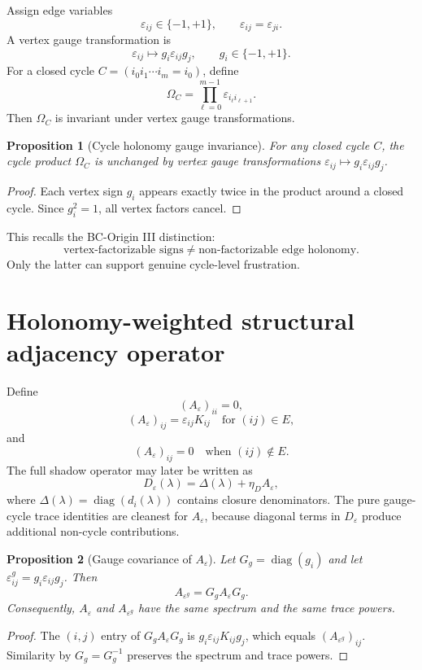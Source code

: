 \documentclass[11pt]{article}
\newtheorem{proposition}{Proposition}
\begin{document}
Assign edge variables
\[
\varepsilon_{ij}\in\{-1,+1\},\qquad \varepsilon_{ij}=\varepsilon_{ji}.
\]
A vertex gauge transformation is
\[
\varepsilon_{ij}\mapsto g_i\varepsilon_{ij}g_j,\qquad g_i\in\{-1,+1\}.
\]
For a closed cycle $C=(i_0i_1\cdots i_m=i_0)$, define
\[
\Omega_C=\prod_{\ell=0}^{m-1}\varepsilon_{i_\ell i_{\ell+1}}.
\]
Then $\Omega_C$ is invariant under vertex gauge transformations.

\begin{proposition}[Cycle holonomy gauge invariance]
For any closed cycle $C$, the cycle product $\Omega_C$ is unchanged by vertex gauge transformations $\varepsilon_{ij}\mapsto g_i\varepsilon_{ij}g_j$.
\end{proposition}

\begin{proof}
Each vertex sign $g_i$ appears exactly twice in the product around a closed cycle. Since $g_i^2=1$, all vertex factors cancel.
\end{proof}

This recalls the BC-Origin III distinction:
\[
\text{vertex-factorizable signs}\neq\text{non-factorizable edge holonomy}.
\]
Only the latter can support genuine cycle-level frustration.

\section{Holonomy-weighted structural adjacency operator}

Define
\[
(A_\varepsilon)_{ii}=0,
\]
\[
(A_\varepsilon)_{ij}=\varepsilon_{ij}K_{ij}\quad\text{for }(ij)\in E,
\]
and
\[
(A_\varepsilon)_{ij}=0\quad\text{when }(ij)\notin E.
\]
The full shadow operator may later be written as
\[
D_\varepsilon(\lambda)=\Delta(\lambda)+\eta_D A_\varepsilon,
\]
where $\Delta(\lambda)=\operatorname{diag}(d_i(\lambda))$ contains closure denominators. The pure gauge-cycle trace identities are cleanest for $A_\varepsilon$, because diagonal terms in $D_\varepsilon$ produce additional non-cycle contributions.

\begin{proposition}[Gauge covariance of $A_\varepsilon$]
Let $G_g=\operatorname{diag}(g_i)$ and let $\varepsilon^g_{ij}=g_i\varepsilon_{ij}g_j$. Then
\[
A_{\varepsilon^g}=G_g A_\varepsilon G_g.
\]
Consequently, $A_\varepsilon$ and $A_{\varepsilon^g}$ have the same spectrum and the same trace powers.
\end{proposition}

\begin{proof}
The $(i,j)$ entry of $G_g A_\varepsilon G_g$ is $g_i\varepsilon_{ij}K_{ij}g_j$, which equals $(A_{\varepsilon^g})_{ij}$. Similarity by $G_g=G_g^{-1}$ preserves the spectrum and trace powers.
\end{proof}
\end{document}
